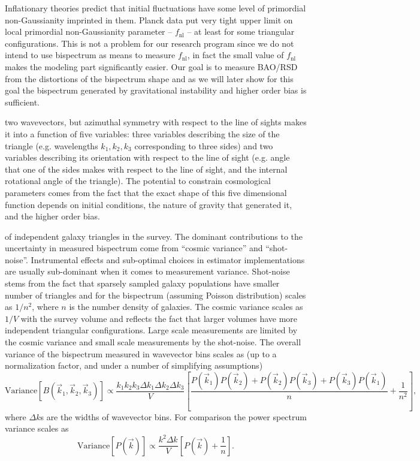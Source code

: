 Inflationary theories predict that initial fluctuations have some level of
primordial non-Gaussianity imprinted in them. Planck data put very tight upper
limit on local primordial non-Gaussianity parameter -- $f_\mathrm{nl}$ -- at
least for some triangular configurations. This is not a problem for our
research program since we do not intend to use bispectrum as means to measure
$f_\mathrm{nl}$, in fact the small value of $f_\mathrm{nl}$ makes the modeling
part significantly easier. Our goal is to measure BAO/RSD from the distortions
of the bispectrum shape and as we will later show for this goal the bispectrum
generated by gravitational instability and higher order bias is sufficient.

two wavevectors, but azimuthal symmetry with respect to the line of sights
makes it into a function of five variables: three variables describing the
size of the triangle (e.g. wavelengths $k_1, k_2, k_3$ corresponding to three
sides) and two variables describing its orientation with respect to the line
of sight (e.g. angle that one of the sides makes with respect to the line of
sight, and the internal rotational angle of the triangle). The potential to
constrain cosmological parameters comes from the fact that the exact shape of
this  five dimensional function depends on initial conditions, the nature of
gravity that generated it, and the higher order bias.

of independent galaxy triangles in the survey. The dominant contributions to
the uncertainty in measured bispectrum come from ``cosmic variance'' and
``shot-noise''. Instrumental effects and sub-optimal choices in estimator
implementations are usually sub-dominant when it comes to measurement
variance. Shot-noise stems from the fact that sparsely sampled galaxy
populations have smaller number of triangles and for the bispectrum (assuming
Poisson distribution) scales as  $1/n^2$, where $n$ is the number density of
galaxies. The cosmic variance scales as $1/V$ with the survey volume and
reflects the fact that larger volumes have more independent triangular
configurations. Large scale measurements are limited by the cosmic variance
and small scale measurements by the shot-noise. The overall variance of the
bispectrum measured in wavevector bins scales as (up to a normalization
factor, and under a number of simplifying assumptions)  \begin{equation}
\mathrm{Variance}\left[B(\vec{k}_1,\vec{k}_2,\vec{k}_3)\right] \propto
\frac{k_1k_2k_3\Delta k_1\Delta k_2\Delta
k_3}{V}\left[\frac{P(\vec{k}_1)P(\vec{k}_2) + P(\vec{k}_2)P(\vec{k}_3) +
P(\vec{k}_3)P(\vec{k}_1)}{n} + \frac{1}{n^2}\right], \end{equation} where
$\Delta k$s are the widths of wavevector bins. For comparison the power
spectrum variance scales as \begin{equation}
\mathrm{Variance}\left[P(\vec{k})\right] \propto \frac{k^2\Delta
k}{V}\left[P(\vec{k}) + \frac{1}{n}\right].  
\end{equation}  

